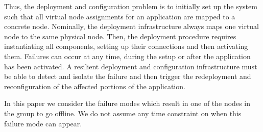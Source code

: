 Thus, the deployment and configuration problem is to initially set up
the system such that all virtual node assignments for an application are
mapped to a concrete node. Nominally, the deployment infrastructure
always maps one virtual node to the same physical node. Then, the
deployment procedure requires instantiating all components, setting up
their connections and then activating them. Failures can occur at any
time, during the setup or after the application has been activated. A
resilient deployment and configuration infrastructure must be able to
detect and isolate the failure and then trigger the redeployment and
reconfiguration of the affected portions of the application.

In this paper we consider the failure modes which result in one of the
nodes in the group to go offline. We do not assume any time constraint
on when this failure mode can appear.


%
%
%
%
%
